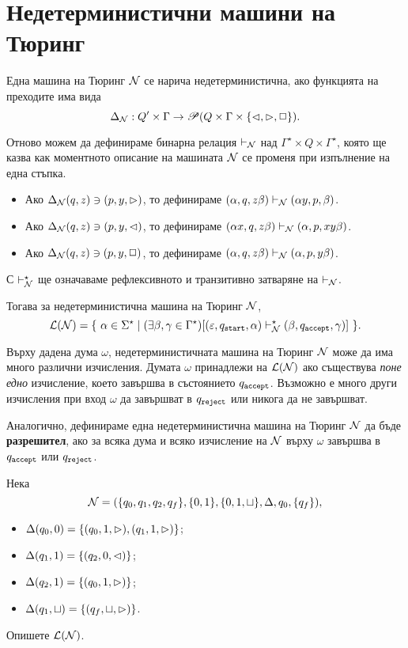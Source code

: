 \section{Недетерминистични машини на Тюринг}

Една машина на Тюринг $\mathcal{N}$ се нарича недетерминистична, ако функцията на преходите има вида
\[\Delta_{\mathcal{N}}: Q'\times \Gamma \to \mathscr{P}(Q \times \Gamma\times \{\lhd,\rhd,\Box\}). \]

Отново можем да дефинираме бинарна релация $\vdash_{\mathcal{N}}$ над $\Gamma^\star \times Q \times \Gamma^\star$,
която ще казва как моментното описание на машината $\mathcal{N}$ се променя при изпълнение на една стъпка.
\begin{itemize}
\item
  Ако $\Delta_{\mathcal{N}}(q,z) \ni (p,y,\rhd)$, то дефинираме $(\alpha, q, z\beta) \vdash_{\mathcal{N}} (\alpha y, p, \beta)$.
\item 
  Ако $\Delta_{\mathcal{N}}(q,z) \ni (p,y,\lhd)$, то дефинираме $(\alpha x, q, z\beta) \vdash_{\mathcal{N}} (\alpha , p, xy\beta)$.
\item 
  Ако $\Delta_{\mathcal{N}}(q,z) \ni (p,y,\Box)$, то дефинираме $(\alpha, q, z\beta) \vdash_{\mathcal{N}} (\alpha, p, y\beta)$.
\end{itemize}
С $\vdash^\star_{\mathcal{N}}$ ще означаваме рефлексивното и транзитивно затваряне на $\vdash_{\mathcal{N}}$.

Тогава за недетерминистична машина на Тюринг $\mathcal{N}$, 
\[\mathcal{L}(\mathcal{N}) = \{\ \alpha\in\Sigma^\star \mid (\exists \beta,\gamma \in \Gamma^\star)[(\varepsilon, q_{\texttt{start}}, \alpha) \vdash^\star_{\mathcal{N}} (\beta, q_{\texttt{accept}}, \gamma) ]\ \}.\]

\begin{remark}
  Върху дадена дума $\omega$, недетерминистичната машина на Тюринг $\mathcal{N}$ може да има много различни изчисления.
  Думата $\omega$ принадлежи на $\mathcal{L}(\mathcal{N})$ ако съществува {\em поне едно} изчисление, което завършва в състоянието $q_{\texttt{accept}}$.
  Възможно е много други изчисления при вход $\omega$ да завършват в $q_{\texttt{reject}}$ или никога да не завършват.
\end{remark}

Аналогично, дефинираме една недетерминистична машина на Тюринг $\mathcal{N}$ да бъде {\bf разрешител}, ако за всяка дума и 
всяко изчисление на $\mathcal{N}$ върху $\omega$ завършва в $q_{\texttt{accept}}$ или $q_{\texttt{reject}}$.

\begin{problem}
  Нека
  \[\mathcal{N} = (\{q_0,q_1,q_2,q_f\}, \{0,1\}, \{0,1,\sqcup\}, \Delta, q_0, \{q_f\}),\]
  \begin{itemize}
  \item 
    $\Delta(q_0,0) = \{(q_0,1,\rhd),(q_1,1,\rhd)\}$;
  \item
    $\Delta(q_1,1) = \{(q_2,0,\lhd)\}$;
  \item
    $\Delta(q_2,1) = \{(q_0,1,\rhd)\}$;
  \item
    $\Delta(q_1,\sqcup) = \{(q_f,\sqcup,\rhd)\}$.
  \end{itemize}
  Опишете $\mathcal{L}(\mathcal{N})$.
\end{problem}

